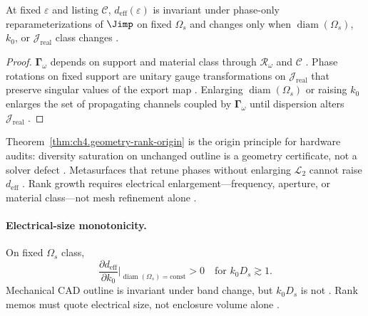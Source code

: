 \begin{theorem}
\label{thm:ch4.geometry-rank-origin}
At fixed \(\varepsilon\) and listing \(\mathcal{C}\), \(d_{\mathrm{eff}}(\varepsilon)\) is invariant under phase-only
reparameterizations of \(\Jimp\) on fixed \(\Omega_{s}\) and changes only when \(\operatorname{diam}(\Omega_{s})\), \(k_{0}\), or
\(\mathcal{J}_{\mathrm{real}}\) class changes \cite{stratton1941,jackson1999,hansen1988,harrington2001,devaney2004}.
\end{theorem}
\begin{proof}
\(\boldsymbol{\Gamma}_\omega\) depends on support and material class through \(\mathcal{R}_\omega\) and \(\mathcal{C}\) \cite{stratton1941,harrington2001}.
Phase rotations on fixed support are unitary gauge transformations on \(\mathcal{J}_{\mathrm{real}}\) that preserve singular values of the export map
\cite{hansen1988,devaney2004}. Enlarging \(\operatorname{diam}(\Omega_{s})\) or raising \(k_{0}\) enlarges the set of propagating channels coupled by
\(\boldsymbol{\Gamma}_\omega\) until dispersion alters \(\mathcal{J}_{\mathrm{real}}\) \cite{jackson1999,collin2001}.
\end{proof}

Theorem~\ref{thm:ch4.geometry-rank-origin} is the origin principle for hardware audits: diversity saturation on unchanged outline is a geometry certificate,
not a solver defect \cite{stratton1941,harrington2001}. Metasurfaces that retune phases without enlarging \(\mathcal{L}_{2}\) cannot raise \(d_{\mathrm{eff}}\)
\cite{hansen1988,devaney2004}. Rank growth requires electrical enlargement---frequency, aperture, or material class---not mesh refinement alone
\cite{jackson1999,collin2001}.

\paragraph{Electrical-size monotonicity.}
On fixed \(\Omega_{s}\) class,
\begin{equation}
\label{eq:ch4.outline-trap}
\frac{\partial d_{\mathrm{eff}}}{\partial k_{0}}\Big|_{\operatorname{diam}(\Omega_{s})=\text{const}}>0\quad\text{for }k_{0}D_{s}\gtrsim1.
\end{equation}
Mechanical CAD outline is invariant under band change, but \(k_{0}D_{s}\) is not \cite{jackson1999,harrington2001}. Rank memos must quote electrical
size, not enclosure volume alone \cite{hansen1988,stratton1941,devaney2004}.


